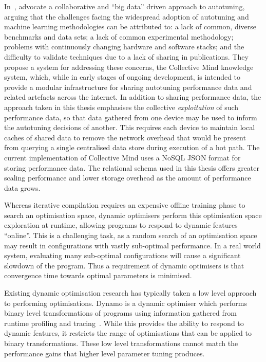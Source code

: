 %
%

In~\cite{Saclay2010,Memon2013,Fursin2014}, \citeauthor{Fursin2014} advocate a collaborative and ``big data'' driven approach to autotuning, arguing that the challenges facing the widespread adoption of autotuning and machine learning methodologies can be attributed to: a lack of common, diverse benchmarks and data sets; a lack of common experimental methodology; problems with continuously changing hardware and software stacks; and the difficulty to validate techniques due to a lack of sharing in publications. They propose a system for addressing these concerns, the Collective Mind knowledge system, which, while in early stages of ongoing development, is intended to provide a modular infrastructure for sharing autotuning performance data and related artefacts across the internet. In addition to sharing performance data, the approach taken in this thesis emphasises the collective \emph{exploitation} of such performance data, so that data gathered from one device may be used to inform the autotuning decisions of another. This requires each device to maintain local caches of shared data to remove the network overhead that would be present from querying a single centralised data store during execution of a hot path. The current implementation of Collective Mind uses a NoSQL JSON format for storing performance data. The relational schema used in this thesis offers greater scaling performance and lower storage overhead as the amount of performance data grows.

Whereas iterative compilation requires an expensive offline training
phase to search an optimisation space, dynamic optimisers perform this
optimisation space exploration at runtime, allowing programs to
respond to dynamic features ``online''. This is a challenging task, as
a random search of an optimisation space may result in configurations
with vastly sub-optimal performance. In a real world system, evaluating
many sub-optimal configurations will cause a significant slowdown of
the program. Thus a requirement of dynamic optimisers is that
convergence time towards optimal parameters is minimised.

Existing dynamic optimisation research has typically taken a low level
approach to performing optimisations. Dynamo is a dynamic optimiser
which performs binary level transformations of programs using
information gathered from runtime profiling and
tracing~\cite{Bala2000}. While this provides the ability to respond to
dynamic features, it restricts the range of optimisations that can be
applied to binary transformations. These low level transformations
cannot match the performance gains that higher level parameter tuning
produces.

